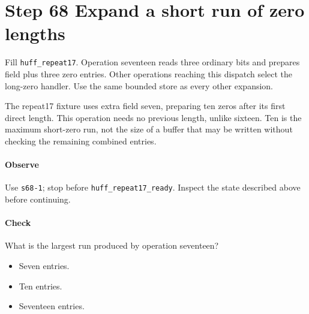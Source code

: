 \section{Step 68 Expand a short run of zero lengths}\label{png-huff-s68}
Fill \texttt{huff\_repeat17}. Operation seventeen reads three ordinary bits and prepares field plus three zero entries. Other operations reaching this dispatch select the long-zero handler. Use the same bounded store as every other expansion.

The repeat17 fixture uses extra field seven, preparing ten zeros after its first direct length. This operation needs no previous length, unlike sixteen. Ten is the maximum short-zero run, not the size of a buffer that may be written without checking the remaining combined entries.

\paragraph{Observe} Use \texttt{s68-1}; stop before \texttt{huff\_repeat17\_ready}. Inspect the state described above before continuing.

\paragraph{Check} What is the largest run produced by operation seventeen?
\begin{itemize}
  \item[A.] Seven entries.
  \item[B.] Ten entries.
  \item[C.] Seventeen entries.
\end{itemize}
